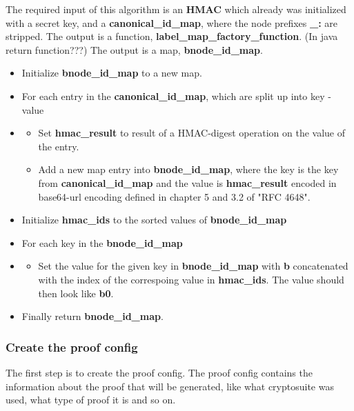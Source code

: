 \documentclass[
	a4paper               %
	,bibliography=totoc   %
	,listof=totoc         %
	,monolingual
	twoside=false,
]{bfhthesis}              %
\begin{document}
The required input of this algorithm is an \textbf{HMAC} which already was initialized with a secret key, and a \textbf{canonical\_id\_map}, where the node prefixes \textbf{\_:} are stripped.
The output is a function, \textbf{label\_map\_factory\_function}. (In java return function???)
The output is a map, \textbf{bnode\_id\_map}.

\begin{itemize}
	\item Initialize \textbf{bnode\_id\_map} to a new map.
	\item For each entry in the \textbf{canonical\_id\_map}, which are split up into key - value
	\item \begin{itemize}
		\item Set \textbf{hmac\_result} to result of a HMAC-digest operation on the value of the entry. 
		\item Add a new map entry into \textbf{bnode\_id\_map}, where the key is the key from \textbf{canonical\_id\_map} and the value is \textbf{hmac\_result} encoded in base64-url encoding defined in chapter 5 and 3.2 of "RFC 4648"\cite{base64}.
	\end{itemize}
	\item Initialize \textbf{hmac\_ids} to the sorted values of \textbf{bnode\_id\_map}
	\item For each key in the \textbf{bnode\_id\_map}
	\item \begin{itemize}
		\item Set the value for the given key in \textbf{bnode\_id\_map} with \textbf{b} concatenated with the index of the correspoing value in \textbf{hmac\_ids}. The value should then look like \textbf{b0}.
	\end{itemize}
	\item Finally return \textbf{bnode\_id\_map}.
\end{itemize}


\subsubsection{Create the proof config}
The first step is to create the proof config.
The proof config contains the information about the proof that will be generated, like what cryptosuite was used, what type of proof it is and so on.
\end{document}
